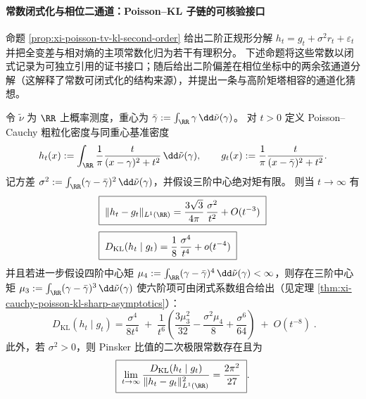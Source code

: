 \paragraph{常数闭式化与相位二通道：Poisson--KL 子链的可核验接口}\label{par:xi-poisson-tv-kl-sharp-constants-channelization}
命题 \ref{prop:xi-poisson-tv-kl-second-order} 给出二阶正规形分解
\(
h_t=g_t+\sigma^2 r_t+\varepsilon_t
\)
并把全变差与相对熵的主项常数化归为若干有理积分。
下述命题将这些常数以闭式记录为可独立引用的证书接口；随后给出二阶偏差在相位坐标中的两余弦通道分解（这解释了常数可闭式化的结构来源），并提出一条与高阶矩塔相容的通道化猜想。

\begin{proposition}\label{prop:xi-cauchy-poisson-tv-kl-sharp-interface}
令 \(\tilde\nu\) 为 \(\RR\) 上概率测度，重心为
\(
\bar\gamma:=\int_{\RR}\gamma\,\dd\tilde\nu(\gamma)
\)。
对 \(t>0\) 定义 Poisson--Cauchy 粗粒化密度与同重心基准密度
\[
h_t(x):=\int_{\RR}\frac{1}{\pi}\frac{t}{(x-\gamma)^2+t^2}\,\dd\tilde\nu(\gamma),\qquad
g_t(x):=\frac{1}{\pi}\frac{t}{(x-\bar\gamma)^2+t^2}.
\]
记方差 \(\sigma^2:=\int_{\RR}(\gamma-\bar\gamma)^2\,\dd\tilde\nu(\gamma)\)，并假设三阶中心绝对矩有限。
则当 \(t\to\infty\) 有
\begin{align}
&\boxed{\;
\|h_t-g_t\|_{L^1(\RR)}
=\frac{3\sqrt3}{4\pi}\,\frac{\sigma^2}{t^2}+O(t^{-3})\;}\label{eq:xi-cauchy-poisson-tv-sharp-mainterm}\\[1mm]
&\boxed{\;
D_{\mathrm{KL}}(h_t\mid g_t)
=\frac{1}{8}\,\frac{\sigma^4}{t^4}+o(t^{-4})\;}
\label{eq:xi-cauchy-poisson-kl-mainterm}
\end{align}
并且若进一步假设四阶中心矩 \(\mu_4:=\int_{\RR}(\gamma-\bar\gamma)^4\,\dd\tilde\nu(\gamma)<\infty\)，则存在三阶中心矩 \(\mu_3:=\int_{\RR}(\gamma-\bar\gamma)^3\,\dd\tilde\nu(\gamma)\) 使六阶项可由闭式系数组合给出（见定理 \ref{thm:xi-cauchy-poisson-kl-sharp-asymptotics}）：
\begin{equation}\label{eq:xi-cauchy-poisson-kl-sixth-interface}
\boxed{\;
D_{\mathrm{KL}}(h_t\mid g_t)
=\frac{\sigma^4}{8t^4}
\;+\;\frac{1}{t^6}\left(
\frac{3\mu_3^2}{32}
-\frac{\sigma^2\mu_4}{8}
+\frac{\sigma^6}{64}
\right)
\;+\;O(t^{-8})\; }.
\end{equation}
此外，若 \(\sigma^2>0\)，则 Pinsker 比值的二次极限常数存在且为
\begin{equation}\label{eq:xi-cauchy-poisson-pinsker-interface}
\boxed{\;
\lim_{t\to\infty}\frac{D_{\mathrm{KL}}(h_t\mid g_t)}{\|h_t-g_t\|_{L^1(\RR)}^2}
=\frac{2\pi^2}{27}\; }.
\end{equation}
\end{proposition}

